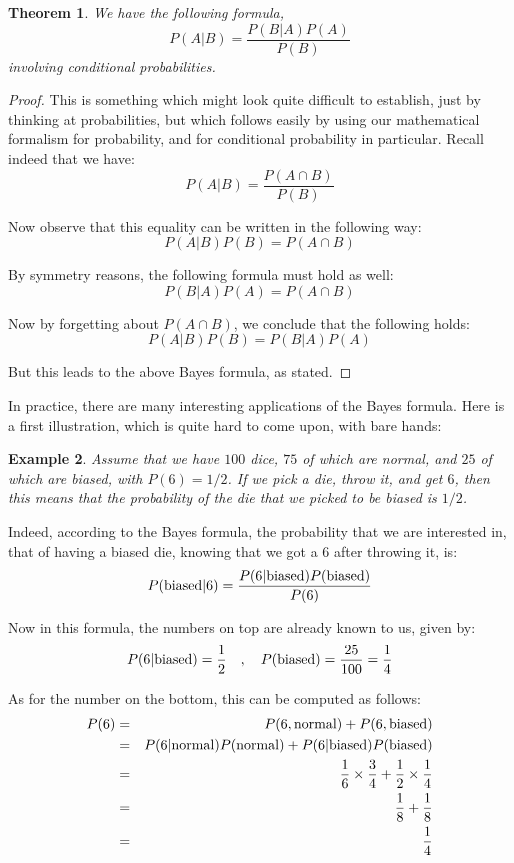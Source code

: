 \documentclass[12pt]{amsbook}
\newtheorem{theorem}{Theorem}[chapter]
\newtheorem{example}[theorem]{Example}
\begin{document}

\begin{theorem}
We have the following formula,
$$P(A|B)=\frac{P(B|A)P(A)}{P(B)}$$
involving conditional probabilities.
\end{theorem}

\begin{proof}
This is something which might look quite difficult to establish, just by thinking at probabilities, but which follows easily by using our mathematical formalism for probability, and for conditional probability in particular. Recall indeed that we have:
$$P(A|B)=\frac{P(A\cap B)}{P(B)}$$

Now observe that this equality can be written in the following way:
$$P(A|B)P(B)=P(A\cap B)$$

By symmetry reasons, the following formula must hold as well:
$$P(B|A)P(A)=P(A\cap B)$$

Now by forgetting about $P(A\cap B)$, we conclude that the following holds:
$$P(A|B)P(B)=P(B|A)P(A)$$

But this leads to the above Bayes formula, as stated.
\end{proof}

In practice, there are many interesting applications of the Bayes formula. Here is a first illustration, which is quite hard to come upon, with bare hands:

\begin{example}
Assume that we have $100$ dice, $75$ of which are normal, and $25$ of which are biased, with $P(6)=1/2$. If we pick a die, throw it, and get $6$, then this means that the probability of the die that we picked to be biased is $1/2$. 
\end{example}

Indeed, according to the Bayes formula, the probability that we are interested in, that of having a biased die, knowing that we got a 6 after throwing it, is:
$$P({\rm biased}|6)=\frac{P(6|{\rm biased})P({\rm biased})}{P(6)}$$

Now in this formula, the numbers on top are already known to us, given by:
$$P(6|{\rm biased})=\frac{1}{2}\quad,\quad P({\rm biased})=\frac{25}{100}=\frac{1}{4}$$

As for the number on the bottom, this can be computed as follows:
\begin{eqnarray*}
P(6)
&=&P(6,{\rm normal})+P(6,{\rm biased})\\
&=&P(6|{\rm normal})P({\rm normal})+P(6|{\rm biased})P({\rm biased})\\
&=&\frac{1}{6}\times\frac{3}{4}+\frac{1}{2}\times\frac{1}{4}\\
&=&\frac{1}{8}+\frac{1}{8}\\
&=&\frac{1}{4}
\end{eqnarray*}
\end{document}
